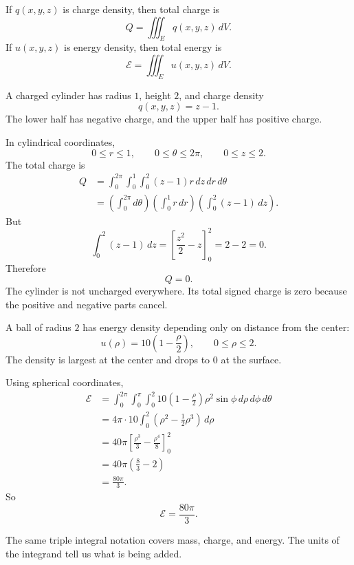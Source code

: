 If \(q(x,y,z)\) is charge density, then total charge is
\[
\boxed{
    Q=\iiint_E q(x,y,z)\,dV.
}
\]
If \(u(x,y,z)\) is energy density, then total energy is
\[
\boxed{
    \mathcal E=\iiint_E u(x,y,z)\,dV.
}
\]

\begin{example}
A charged cylinder has radius \(1\), height \(2\), and charge density
\[
    q(x,y,z)=z-1.
\]
The lower half has negative charge, and the upper half has positive charge.

In cylindrical coordinates,
\[
    0\le r\le1,
    \qquad
    0\le\theta\le2\pi,
    \qquad
    0\le z\le2.
\]
The total charge is
\[
\begin{aligned}
Q
&=
\int_0^{2\pi}\int_0^1\int_0^2
(z-1)r\,dz\,dr\,d\theta\\
&=
\left(\int_0^{2\pi}d\theta\right)
\left(\int_0^1 r\,dr\right)
\left(\int_0^2(z-1)\,dz\right).
\end{aligned}
\]
But
\[
    \int_0^2(z-1)\,dz
    =
    \left[\frac{z^2}{2}-z\right]_0^2
    =
    2-2
    =
    0.
\]
Therefore
\[
\boxed{
    Q=0.
}
\]
The cylinder is not uncharged everywhere.  Its total signed charge is zero because the
positive and negative parts cancel.
\end{example}

\begin{example}
A ball of radius \(2\) has energy density depending only on distance from the center:
\[
    u(\rho)=10\left(1-\frac{\rho}{2}\right),
    \qquad
    0\le \rho\le2.
\]
The density is largest at the center and drops to \(0\) at the surface.

Using spherical coordinates,
\[
\begin{aligned}
\mathcal E
&=
\int_0^{2\pi}\int_0^\pi\int_0^2
10\left(1-\frac{\rho}{2}\right)\rho^2\sin\phi
\,d\rho\,d\phi\,d\theta\\
&=
4\pi\cdot10\int_0^2
\left(\rho^2-\frac12\rho^3\right)\,d\rho\\
&=
40\pi
\left[
\frac{\rho^3}{3}-\frac{\rho^4}{8}
\right]_0^2\\
&=
40\pi\left(\frac83-2\right)\\
&=
\frac{80\pi}{3}.
\end{aligned}
\]
So
\[
\boxed{
    \mathcal E=\frac{80\pi}{3}.
}
\]
\end{example}

The same triple integral notation covers mass, charge, and energy.  The units of the
integrand tell us what is being added.

